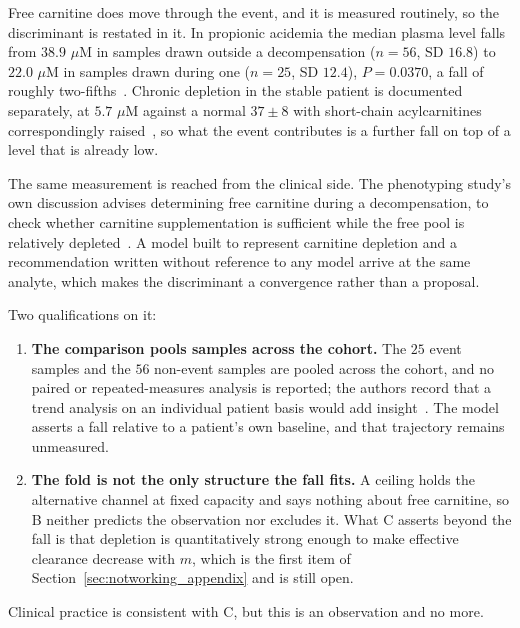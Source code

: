 Free carnitine does move through the event, and it is measured routinely, so the
discriminant is restated in it. In propionic acidemia the median plasma level falls from
$38.9$ $\mu$M in samples drawn outside a decompensation ($n = 56$, SD $16.8$) to $22.0$
$\mu$M in samples drawn during one ($n = 25$, SD $12.4$), $P = 0.0370$, a fall of
roughly two-fifths~\cite{amd_phenotyping}. %
Chronic depletion in the stable patient is documented separately, at $5.7$ $\mu$M against a
normal $37 \pm 8$ with short-chain acylcarnitines correspondingly
raised~\cite{carnitine_pa_child}, %
so what the event contributes is a further fall on top of a level that is already low.

The same measurement is reached from the clinical side. The phenotyping study's own
discussion advises determining free carnitine during a decompensation, to check whether
carnitine supplementation is sufficient while the free pool is relatively
depleted~\cite{amd_phenotyping}. %
A model built to represent carnitine depletion and a recommendation written without
reference to any model arrive at the same analyte, which makes the discriminant a
convergence rather than a proposal.

Two qualifications on it:

\begin{enumerate}[leftmargin=*, itemsep=2pt]
\item \textbf{The comparison pools samples across the cohort.} The
      $25$ event samples and the $56$ non-event samples are pooled across the cohort, and no
      paired or repeated-measures analysis is reported; the authors record that a trend
      analysis on an individual patient basis would add insight~\cite{amd_phenotyping}. %
      The model asserts a fall relative to a patient's own baseline, and that trajectory
      remains unmeasured.
\item \textbf{The fold is not the only structure the fall fits.} A ceiling holds the
      alternative channel at fixed capacity and says nothing about free carnitine, so B
      neither predicts the observation nor excludes it. What C asserts beyond the
      fall is that depletion is quantitatively strong enough to make effective clearance
      decrease with $m$, which is the first item of
      Section~\ref{sec:notworking_appendix} and is still open.
\end{enumerate}

Clinical practice is consistent with C, but this is an observation and no more.


